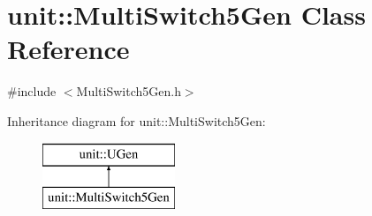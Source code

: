 \hypertarget{classunit_1_1MultiSwitch5Gen}{}\section{unit\+:\+:Multi\+Switch5\+Gen Class Reference}
\label{classunit_1_1MultiSwitch5Gen}


{\ttfamily \#include $<$Multi\+Switch5\+Gen.\+h$>$}

Inheritance diagram for unit\+:\+:Multi\+Switch5\+Gen\+:\begin{figure}[H]
\begin{center}
\leavevmode
\includegraphics[height=2.000000cm]{classunit_1_1MultiSwitch5Gen}
\end{center}
\end{figure}

